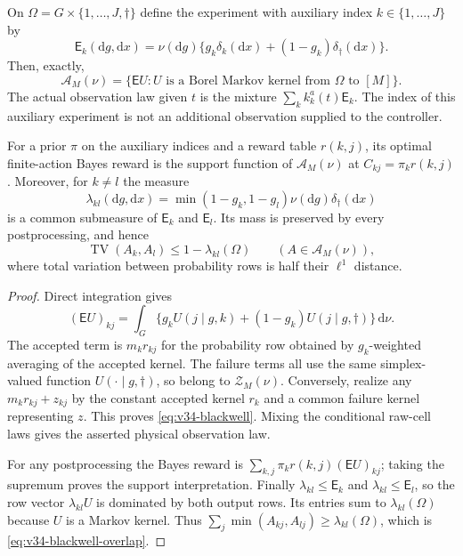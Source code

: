 \begin{proposition}
\label{prop:v34-blackwell}
On $\Omega=G\times\{1,\ldots,J,\dagger\}$ define the experiment
with auxiliary index $k\in\{1,\ldots,J\}$ by
\begin{equation}\label{eq:v34-experiment}
 \mathsf E_k(\mathrm dg,\mathrm dx)=\nu(\mathrm dg)
       \{g_k\delta_k(\mathrm dx)+(1-g_k)\delta_\dagger(\mathrm dx)\}.
\end{equation}
Then, exactly,
\begin{equation}\label{eq:v34-blackwell}
 \mathscr A_M(\nu)=\{\mathsf E U:
       U\text{ is a Borel Markov kernel from }\Omega\text{ to }[M]\}.
\end{equation}
The actual observation law given $t$ is the mixture
$\sum_k k_k^a(t)\mathsf E_k$. The index of this auxiliary experiment
is not an additional observation supplied to the controller.

For a prior $\pi$ on the auxiliary indices and a reward table
$r(k,j)$, its optimal finite-action Bayes reward is the support function
of $\mathscr A_M(\nu)$ at $C_{kj}=\pi_k r(k,j)$. Moreover, for
$k\ne l$ the measure
\[
 \lambda_{kl}(\mathrm dg,\mathrm dx)
 =\min(1-g_k,1-g_l)\nu(\mathrm dg)\delta_\dagger(\mathrm dx)
\]
is a common submeasure of $\mathsf E_k$ and $\mathsf E_l$.
Its mass is preserved by every postprocessing, and hence
\begin{equation}\label{eq:v34-blackwell-overlap}
 \operatorname{TV}(A_k,A_l)
 \le 1-\lambda_{kl}(\Omega)\qquad(A\in\mathscr A_M(\nu)),
\end{equation}
where total variation between probability rows is half their
$\ell^1$ distance.
\end{proposition}
\begin{proof}
Direct integration gives
\[
 (\mathsf E U)_{kj}
   =\int_G\{g_k U(j\mid g,k)
                  +(1-g_k)U(j\mid g,\dagger)\}\,\mathrm d\nu.
\]
The accepted term is $m_k r_{kj}$ for the probability row obtained
by $g_k$-weighted averaging of the accepted kernel. The failure terms
all use the same simplex-valued function $U(\cdot\mid g,\dagger)$,
so belong to $\mathscr Z_M(\nu)$. Conversely, realize any
$m_k r_{kj}+z_{kj}$ by the constant accepted kernel $r_k$ and a
common failure kernel representing $z$. This proves
\eqref{eq:v34-blackwell}. Mixing the conditional raw-cell laws gives
the asserted physical observation law.

For any postprocessing the Bayes reward is
$\sum_{k,j}\pi_k r(k,j)(\mathsf E U)_{kj}$; taking the supremum
proves the support interpretation. Finally $\lambda_{kl}\le\mathsf E_k$
and $\lambda_{kl}\le\mathsf E_l$, so the row vector $\lambda_{kl}U$
is dominated by both output rows. Its entries sum to
$\lambda_{kl}(\Omega)$ because $U$ is a Markov kernel. Thus
$\sum_j\min(A_{kj},A_{lj})\ge\lambda_{kl}(\Omega)$, which is
\eqref{eq:v34-blackwell-overlap}.
\end{proof}


